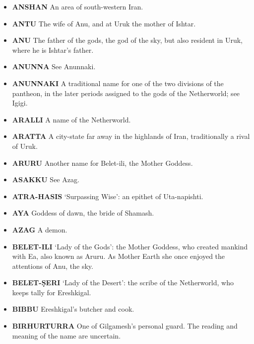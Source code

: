 \documentclass{article}
\begin{document}
\begin{multicols}{3}
\begin{small}
\begin{itemize}[
        label=,
        leftmargin=1.0em,
        itemindent=-1.0em,
        nosep,
    ]
    \item \textbf{ANSHAN}
    An area of south-western Iran.

    \item \textbf{ANTU}
    The wife of Anu, and at Uruk the mother of Ishtar.

    \item \textbf{ANU}
    The father of the gods, the god of the sky, but also resident in Uruk,
    where he is Ishtar's father.

    \item \textbf{ANUNNA}
    See Anunnaki.

    \item \textbf{ANUNNAKI}
    A traditional name for one of the two divisions of the pantheon, in the
    later periods assigned to the gods of the Netherworld; see Igigi.

    \item \textbf{ARALLI}
    A name of the Netherworld.

    \item \textbf{ARATTA}
    A city-state far away in the highlands of Iran, traditionally a rival of
    Uruk.

    \item \textbf{ARURU}
    Another name for Belet-ili, the Mother Goddess.

    \item \textbf{ASAKKU}
    See Azag.

    \item \textbf{ATRA-HASIS}
    `Surpassing Wise': an epithet of Uta-napishti.

    \item \textbf{AYA}
    Goddess of dawn, the bride of Shamash.

    \item \textbf{AZAG}
    A demon.

    \item \textbf{BELET-ILI}
    `Lady of the Gods': the Mother Goddess, who created mankind with Ea,
    also known as Aruru. As Mother Earth she once enjoyed the attentions of
    Anu, the sky.

    \item \textbf{BELET-ṢERI}
    `Lady of the Desert': the scribe of the Netherworld, who keeps tally for
    Ereshkigal.

    \item \textbf{BIBBU}
    Ereshkigal's butcher and cook.

    \item \textbf{BIRHURTURRA}
    One of Gilgamesh's personal guard. The reading and meaning of the name
    are uncertain.


\end{itemize}
\end{small}
\end{multicols}
\end{document}
